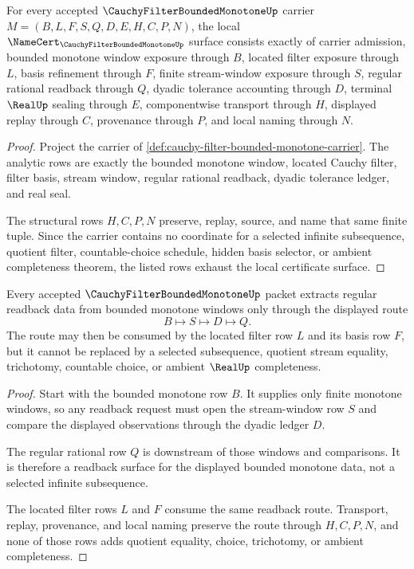 \begin{theorem}
\label{thm:cauchy-filter-bounded-monotone-namecert-obligations}
For every accepted $\CauchyFilterBoundedMonotoneUp$ carrier $M=(B,L,F,S,Q,D,E,H,C,P,N)$, the local $\NameCert_{\CauchyFilterBoundedMonotoneUp}$ surface consists exactly of carrier admission, bounded monotone window exposure through $B$, located filter exposure through $L$, basis refinement through $F$, finite stream-window exposure through $S$, regular rational readback through $Q$, dyadic tolerance accounting through $D$, terminal $\RealUp$ sealing through $E$, componentwise transport through $H$, displayed replay through $C$, provenance through $P$, and local naming through $N$.
\end{theorem}
\begin{proof}
Project the carrier of \autoref{def:cauchy-filter-bounded-monotone-carrier}. The analytic rows are exactly the bounded monotone window, located Cauchy filter, filter basis, stream window, regular rational readback, dyadic tolerance ledger, and real seal.

The structural rows $H,C,P,N$ preserve, replay, source, and name that same finite tuple. Since the carrier contains no coordinate for a selected infinite subsequence, quotient filter, countable-choice schedule, hidden basis selector, or ambient completeness theorem, the listed rows exhaust the local certificate surface.
\end{proof}

\begin{theorem}
\label{thm:cauchy-filter-bounded-monotone-regular-extraction}
Every accepted $\CauchyFilterBoundedMonotoneUp$ packet extracts regular readback data from bounded monotone windows only through the displayed route
$$
B\longmapsto S\longmapsto D\longmapsto Q .
$$
The route may then be consumed by the located filter row $L$ and its basis row $F$, but it cannot be replaced by a selected subsequence, quotient stream equality, trichotomy, countable choice, or ambient $\RealUp$ completeness.
\end{theorem}
\begin{proof}
Start with the bounded monotone row $B$. It supplies only finite monotone windows, so any readback request must open the stream-window row $S$ and compare the displayed observations through the dyadic ledger $D$.

The regular rational row $Q$ is downstream of those windows and comparisons. It is therefore a readback surface for the displayed bounded monotone data, not a selected infinite subsequence.

The located filter rows $L$ and $F$ consume the same readback route. Transport, replay, provenance, and local naming preserve the route through $H,C,P,N$, and none of those rows adds quotient equality, choice, trichotomy, or ambient completeness.
\end{proof}

